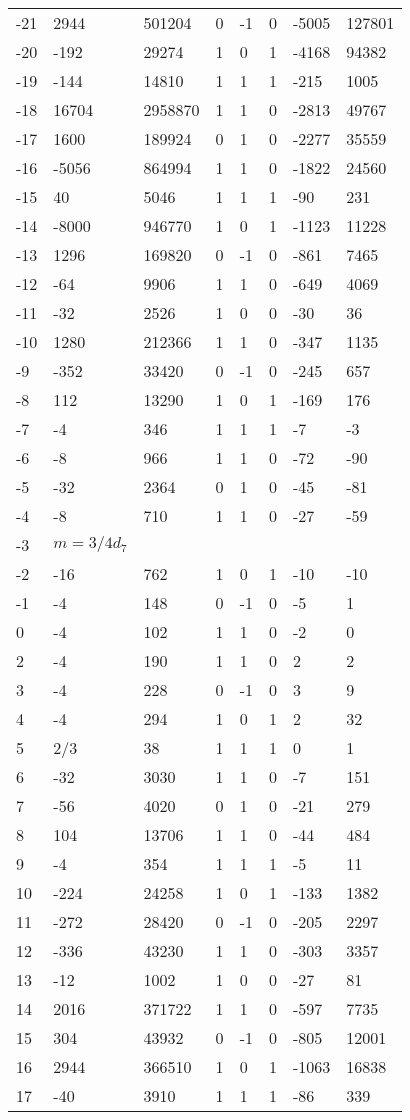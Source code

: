\documentclass{amsart}
\begin{document}
\begin{longtable}{|l|l|l|lllll|}
-21&2944&501204&0&-1&0&-5005&127801\\
-20&-192&29274&1&0&1&-4168&94382\\
-19&-144&14810&1&1&1&-215&1005\\
-18&16704&2958870&1&1&0&-2813&49767\\
-17&1600&189924&0&1&0&-2277&35559\\
-16&-5056&864994&1&1&0&-1822&24560\\
-15&40&5046&1&1&1&-90&231\\
-14&-8000&946770&1&0&1&-1123&11228\\
-13&1296&169820&0&-1&0&-861&7465\\
-12&-64&9906&1&1&0&-649&4069\\
-11&-32&2526&1&0&0&-30&36\\
-10&1280&212366&1&1&0&-347&1135\\
-9&-352&33420&0&-1&0&-245&657\\
-8&112&13290&1&0&1&-169&176\\
-7&-4&346&1&1&1&-7&-3\\
-6&-8&966&1&1&0&-72&-90\\
-5&-32&2364&0&1&0&-45&-81\\
-4&-8&710&1&1&0&-27&-59\\
-3&$m=3/4d_{7}$&&\multicolumn{5}{c|}{}\\
-2&-16&762&1&0&1&-10&-10\\
-1&-4&148&0&-1&0&-5&1\\
0&-4&102&1&1&0&-2&0\\
2&-4&190&1&1&0&2&2\\
3&-4&228&0&-1&0&3&9\\
4&-4&294&1&0&1&2&32\\
5&2/3&38&1&1&1&0&1\\
6&-32&3030&1&1&0&-7&151\\
7&-56&4020&0&1&0&-21&279\\
8&104&13706&1&1&0&-44&484\\
9&-4&354&1&1&1&-5&11\\
10&-224&24258&1&0&1&-133&1382\\
11&-272&28420&0&-1&0&-205&2297\\
12&-336&43230&1&1&0&-303&3357\\
13&-12&1002&1&0&0&-27&81\\
14&2016&371722&1&1&0&-597&7735\\
15&304&43932&0&-1&0&-805&12001\\
16&2944&366510&1&0&1&-1063&16838\\
17&-40&3910&1&1&1&-86&339\\

\end{longtable}
\end{document}
